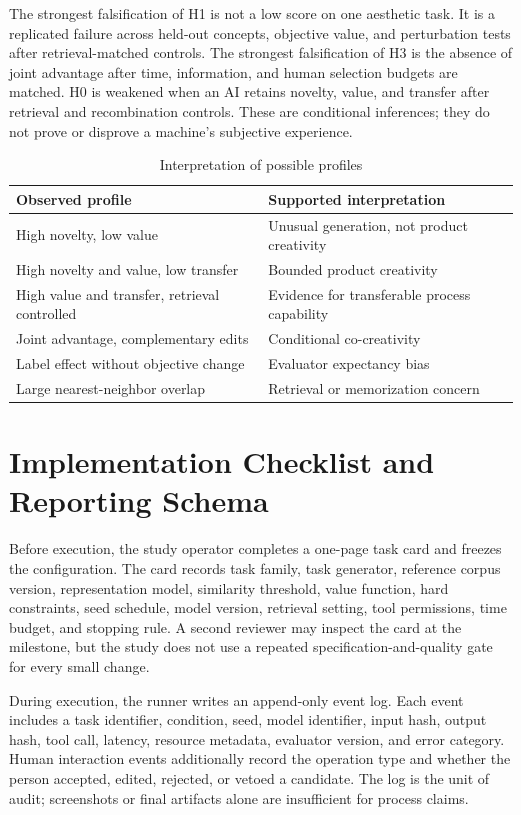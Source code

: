 \documentclass[conference]{IEEEtran}
\begin{document}
The strongest falsification of H1 is not a low score on one aesthetic task. It is a
replicated failure across held-out concepts, objective value, and perturbation tests
after retrieval-matched controls. The strongest falsification of H3 is the absence of
joint advantage after time, information, and human selection budgets are matched. H0 is
weakened when an AI retains novelty, value, and transfer after retrieval and
recombination controls. These are conditional inferences; they do not prove or disprove
a machine's subjective experience.

\begin{table}[t]
\caption{Interpretation of possible profiles}
\label{tab:profiles}
\centering
\footnotesize
\begin{tabular}{p{}p{}}
\hline
Observed profile & Supported interpretation \\
\hline
High novelty, low value & Unusual generation, not product creativity \\
High novelty and value, low transfer & Bounded product creativity \\
High value and transfer, retrieval controlled & Evidence for transferable process capability \\
Joint advantage, complementary edits & Conditional co-creativity \\
Label effect without objective change & Evaluator expectancy bias \\
Large nearest-neighbor overlap & Retrieval or memorization concern \\
\hline
\end{tabular}
\end{table}

\section{Implementation Checklist and Reporting Schema}
\label{sec:implementation}

Before execution, the study operator completes a one-page task card and freezes the
configuration. The card records task family, task generator, reference corpus version,
representation model, similarity threshold, value function, hard constraints, seed
schedule, model version, retrieval setting, tool permissions, time budget, and stopping
rule. A second reviewer may inspect the card at the milestone, but the study does not
use a repeated specification-and-quality gate for every small change.

During execution, the runner writes an append-only event log. Each event includes a task
identifier, condition, seed, model identifier, input hash, output hash, tool call,
latency, resource metadata, evaluator version, and error category. Human interaction
events additionally record the operation type and whether the person accepted, edited,
rejected, or vetoed a candidate. The log is the unit of audit; screenshots or final
artifacts alone are insufficient for process claims.
\end{document}
